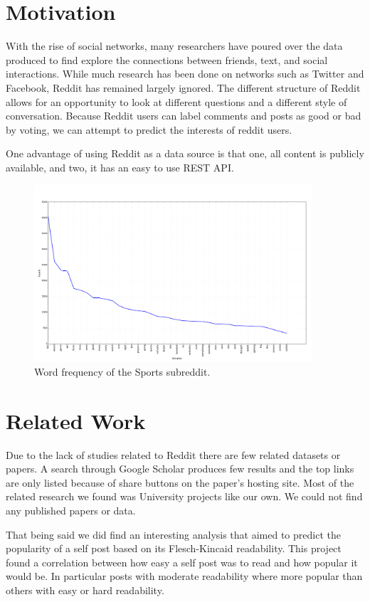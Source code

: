 \documentclass[10pt,twocolumn]{article}
\begin{document}
\section{Motivation}
With the rise of social networks, many researchers have poured over the data produced to find explore the connections between friends, text, and social interactions. While much research has been done on networks such as Twitter and Facebook, Reddit has remained largely ignored. The different structure of Reddit allows for an opportunity to look at different questions and a different style of conversation. Because Reddit users can label comments and posts as good or bad by voting, we can attempt to predict the interests of reddit users.

One advantage of using Reddit as a data source is that one, all content is publicly available, and two, it has an easy to use REST API\cite{reddit}. 

\begin{figure}
    \centering
  	\includegraphics[width=0.92\textwidth]{./sports_freq.png}
  	\caption{Word frequency of the Sports subreddit.}
  	\label{sports}
\end{figure}

\section{Related Work}
Due to the lack of studies related to Reddit there are few related datasets or papers. A search through Google Scholar produces few results and the top links are only listed because of share buttons on the paper's hosting site. Most of the related research we found was University projects like our own. We could not find any published papers or data.

That being said we did find an interesting analysis that aimed to predict the popularity of a self post based on its Flesch-Kincaid readability. This project found a correlation between how easy a self post was to read and how popular it would be. In particular posts with moderate readability where more popular than others with easy or hard readability.
\end{document}
